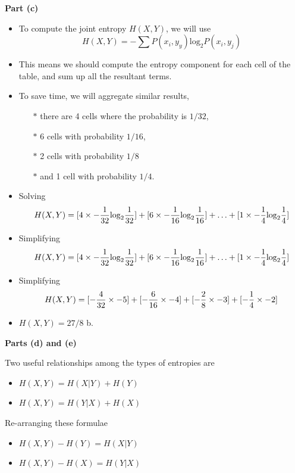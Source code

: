 \documentclass[a4paper,12pt]{article}
\begin{document}
\noindent \textbf{Part (c)}
\begin{itemize}

\item To compute the joint entropy $H(X,Y)$,  we will use \[H(X,Y) = -\sum P(x_i,y_y) \mbox{log}_2P(x_i,y_j)\]

\item This means we should compute the entropy component for each cell of the table, and sum up all the resultant terms.
\bigskip
\item To save time, we will aggregate similar results, 
\begin{itemize} 
\item[$\ast$] there are 4 cells where the probability is $1/32$,
\item[$\ast$] 6 cells with probability $1/16$, 
\item[$\ast$] 2 cells with probability $1/8$
\item[$\ast$] and 1 cell with probability $1/4$. 
\end{itemize}
\item Solving
\[ H(X,Y) = [4 \times -{1\over 32} \mbox{log}_2 {1\over 32} ] + [6 \times -{1\over 16} \mbox{log}_2 {1\over 16} ] + \ldots + [1 \times -{1\over 4} \mbox{log}_2 {1\over 4} ] \]

\item Simplifying\[ H(X,Y) = [4 \times -{1\over 32} \mbox{log}_2 {1\over 32} ] + [6 \times -{1\over 16} \mbox{log}_2 {1\over 16} ] + \ldots + [1 \times -{1\over 4} \mbox{log}_2 {1\over 4} ] \]
\item Simplifying \[H(X,Y) = [-{4\over 32} \times -5 ] + [-{6\over 16} \times -4 ] + [-{2\over 8} \times -3 ] + [ -{1\over 4} \times -2]\]
\item $H(X,Y) = 27/8$ b.
\end{itemize}

\newpage
\noindent \textbf{Parts (d) and (e)}
\begin{framed}
\noindent Two useful relationships among the types of entropies are
\begin{itemize}
\item $H(X,Y)=H(X|Y)+H(Y) $
\item $H(X,Y)=H(Y|X)+H(X) $
\end{itemize}
\bigskip
Re-arranging these formulae
\begin{itemize}
\item $H(X,Y)-H(Y) = H(X|Y) $
\item $H(X,Y)-H(X) = H(Y|X) $
\end{itemize}
\end{framed}
\end{document}
